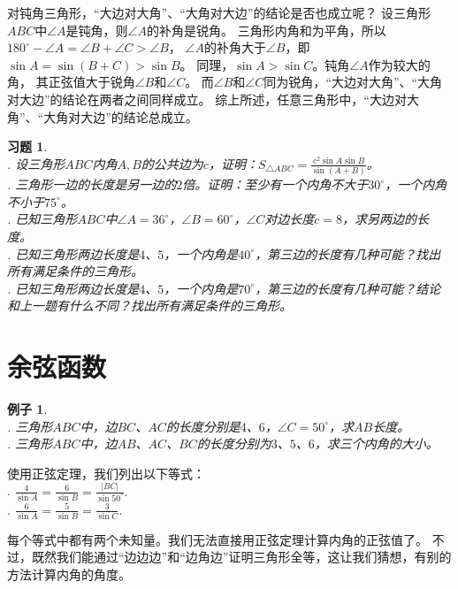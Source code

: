\documentclass[12pt,UTF8]{ctexbook}
\newtheorem{ex}{例子}[section]
\newtheorem{xt}{习题}[section]
\begin{document}
对钝角三角形，“大边对大角”、“大角对大边”的结论是否也成立呢？
设三角形$ABC$中$\angle A$是钝角，则$\angle A$的补角是锐角。
三角形内角和为平角，所以$180^\circ - \angle A = \angle B + \angle C > \angle B$，
$\angle A$的补角大于$\angle B$，即$\sin A = \sin (B + C) > \sin B$。
同理，$\sin A > \sin C$。钝角$\angle A$作为较大的角，
其正弦值大于锐角$\angle B$和$\angle C$。
而$\angle B$和$\angle C$同为锐角，“大边对大角”、“大角对大边”的结论在两者之间同样成立。
综上所述，任意三角形中，“大边对大角”、“大角对大边”的结论总成立。

\begin{xt}\label{xt:2-1-10}
    \mbox{} \\
    . 设三角形$ABC$内角$A,B$的公共边为$c$，证明：$S_{\triangle ABC} = \frac{c^2\sin A\sin B}{\sin (A+B)}$。 \\
    . 三角形一边的长度是另一边的$2$倍。证明：至少有一个内角不大于$30^\circ$，一个内角不小于$75^\circ$。 \\
    . 已知三角形$ABC$中$\angle A = 36^\circ$，$\angle B = 60^\circ$，$\angle C$对边长度$c = 8$，求另两边的长度。 \\
    . 已知三角形两边长度是$4$、$5$，一个内角是$40^\circ$，第三边的长度有几种可能？找出所有满足条件的三角形。 \\
    . 已知三角形两边长度是$4$、$5$，一个内角是$70^\circ$，第三边的长度有几种可能？结论和上一题有什么不同？找出所有满足条件的三角形。
\end{xt}


\section{余弦函数}
\begin{ex}\label{ex:2-2-10}
    \mbox{} \\
    . 三角形$ABC$中，边$BC$、$AC$的长度分别是$4$、$6$，$\angle C = 50^\circ$，求$AB$长度。\\
    . 三角形$ABC$中，边$AB$、$AC$、$BC$的长度分别为$3$、$5$、$6$，求三个内角的大小。
\end{ex}
使用正弦定理，我们列出以下等式：\\
. $ \frac{4}{\sin A} = \frac{6}{\sin B} = \frac{|BC|}{\sin 50^\circ}.$ \\
. $ \frac{6}{\sin A} = \frac{5}{\sin B} = \frac{3}{\sin C}.$

每个等式中都有两个未知量。我们无法直接用正弦定理计算内角的正弦值了。
不过，既然我们能通过“边边边”和“边角边”证明三角形全等，这让我们猜想，有别的方法计算内角的角度。
\end{document}
